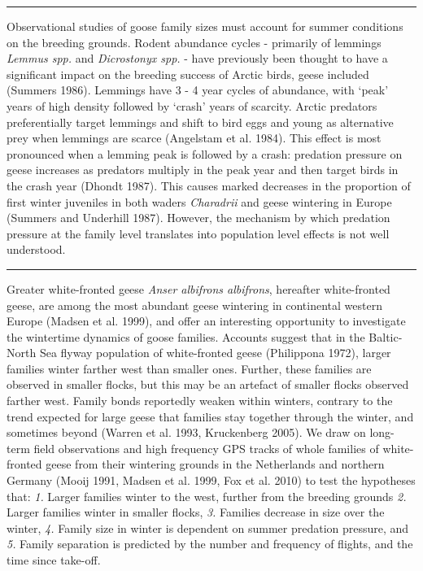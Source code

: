\documentclass[10pt,twocolumn]{paper}
\begin{document}
\begin{center}\rule{0.5\linewidth}{\linethickness}\end{center}

Observational studies of goose family sizes must account for summer
conditions on the breeding grounds. Rodent abundance cycles - primarily
of lemmings \emph{Lemmus spp.} and \emph{Dicrostonyx spp.} - have
previously been thought to have a significant impact on the breeding
success of Arctic birds, geese included (Summers 1986). Lemmings have 3
- 4 year cycles of abundance, with `peak' years of high density followed
by `crash' years of scarcity. Arctic predators preferentially target
lemmings and shift to bird eggs and young as alternative prey when
lemmings are scarce (Angelstam et al. 1984). This effect is most
pronounced when a lemming peak is followed by a crash: predation
pressure on geese increases as predators multiply in the peak year and
then target birds in the crash year (Dhondt 1987). This causes marked
decreases in the proportion of first winter juveniles in both waders
\emph{Charadrii} and geese wintering in Europe (Summers and Underhill
1987). However, the mechanism by which predation pressure at the family
level translates into population level effects is not well understood.

\begin{center}\rule{0.5\linewidth}{\linethickness}\end{center}

Greater white-fronted geese \emph{Anser albifrons albifrons}, hereafter
white-fronted geese, are among the most abundant geese wintering in
continental western Europe (Madsen et al. 1999), and offer an
interesting opportunity to investigate the wintertime dynamics of goose
families. Accounts suggest that in the Baltic-North Sea flyway
population of white-fronted geese (Philippona 1972), larger families
winter farther west than smaller ones. Further, these families are
observed in smaller flocks, but this may be an artefact of smaller
flocks observed farther west. Family bonds reportedly weaken within
winters, contrary to the trend expected for large geese that families
stay together through the winter, and sometimes beyond (Warren et al.
1993, Kruckenberg 2005). We draw on long-term field observations and
high frequency GPS tracks of whole families of white-fronted geese from
their wintering grounds in the Netherlands and northern Germany (Mooij
1991, Madsen et al. 1999, Fox et al. 2010) to test the hypotheses that:
\emph{1.} Larger families winter to the west, further from the breeding
grounds \emph{2.} Larger families winter in smaller flocks, \emph{3.}
Families decrease in size over the winter, \emph{4.} Family size in
winter is dependent on summer predation pressure, and \emph{5.} Family
separation is predicted by the number and frequency of flights, and the
time since take-off.
\end{document}
